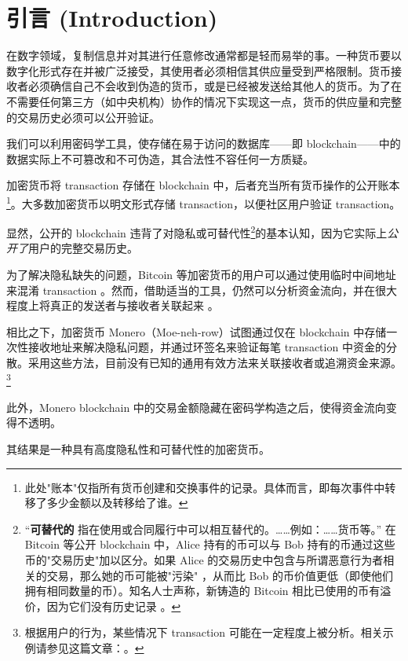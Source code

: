 \chapter{引言 (Introduction)}
\label{chapter:introduction}

在数字领域，复制信息并对其进行任意修改通常都是轻而易举的事。一种货币要以数字化形式存在并被广泛接受，其使用者必须相信其供应量受到严格限制。货币接收者必须确信自己不会收到伪造的货币，或是已经被发送给其他人的货币。为了在不需要任何第三方（如中央机构）协作的情况下实现这一点，货币的供应量和完整的交易历史必须可以公开验证。

我们可以利用密码学工具，使存储在易于访问的数据库——即 blockchain——中的数据实际上不可篡改和不可伪造，其合法性不容任何一方质疑。
\par
加密货币将 transaction 存储在 blockchain 中，后者充当所有货币操作的公开账本\footnote{此处"账本"仅指所有货币创建和交换事件的记录。具体而言，即每次事件中转移了多少金额以及转移给了谁。}。大多数加密货币以明文形式存储 transaction，以便社区用户验证 transaction。
\par
显然，公开的 blockchain 违背了对隐私或可替代性\footnote{``\textbf{可替代的} 指在使用或合同履行中可以相互替代的。……例如：……货币等。''\cite{mises-org-fungible} 在 Bitcoin 等公开 blockchain 中，Alice 持有的币可以与 Bob 持有的币通过这些币的"交易历史"加以区分。如果 Alice 的交易历史中包含与所谓恶意行为者相关的交易，那么她的币可能被"污染" \cite{bitcoin-big-bang-taint}，从而比 Bob 的币价值更低（即使他们拥有相同数量的币）。知名人士声称，新铸造的 Bitcoin 相比已使用的币有溢价，因为它们没有历史记录 \cite{new-bitcoin-premium}。}的基本认知，因为它实际上{\em 公开了}用户的完整交易历史。
\par
为了解决隐私缺失的问题，Bitcoin 等加密货币的用户可以通过使用临时中间地址来混淆 transaction \cite{DBLP:journals/corr/NarayananM17}。然而，借助适当的工具，仍然可以分析资金流向，并在很大程度上将真正的发送者与接收者关联起来 \cite{DBLP:journals/corr/ShenTuY15b, DK-police-tracing-btc, Andrew-Cox-Sandia, chainalysis-2020-report}。

相比之下，加密货币 Monero（Moe-neh-row）试图通过仅在 blockchain 中存储一次性接收地址来解决隐私问题，并通过环签名来验证每笔 transaction 中资金的分散。采用这些方法，目前没有已知的通用有效方法来关联接收者或追溯资金来源。\footnote{根据用户的行为，某些情况下 transaction 可能在一定程度上被分析。相关示例请参见这篇文章：\cite{monero-ring-heuristics-ryo}。}

此外，Monero blockchain 中的交易金额隐藏在密码学构造之后，使得资金流向变得不透明。

其结果是一种具有高度隐私性和可替代性的加密货币。



